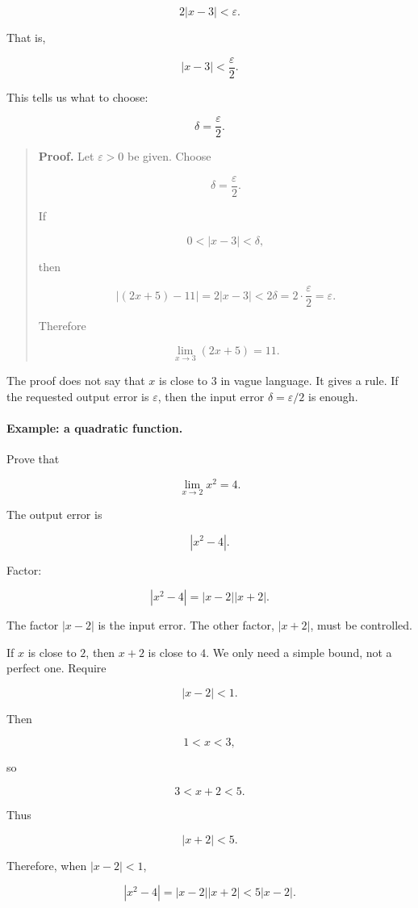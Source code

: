 \[
2|x-3|<\varepsilon.
\]

That is,

\[
|x-3|<\frac{\varepsilon}{2}.
\]

This tells us what to choose:

\[
\delta=\frac{\varepsilon}{2}.
\]

\begin{quote}
\textbf{Proof.}
Let \(\varepsilon>0\) be given.  Choose

\[
\delta=\frac{\varepsilon}{2}.
\]

If

\[
0<|x-3|<\delta,
\]

then

\[
|(2x+5)-11|
=
2|x-3|
<
2\delta
=
2\cdot \frac{\varepsilon}{2}
=
\varepsilon.
\]

Therefore

\[
\lim_{x\to3}(2x+5)=11.
\]
\end{quote}

The proof does not say that \(x\) is close to \(3\) in vague language.  It gives a rule.  If the requested output error is \(\varepsilon\), then the input error \(\delta=\varepsilon/2\) is enough.

\paragraph{Example: a quadratic function.}
Prove that

\[
\lim_{x\to2}x^2=4.
\]

The output error is

\[
|x^2-4|.
\]

Factor:

\[
|x^2-4|
=
|x-2||x+2|.
\]

The factor \(|x-2|\) is the input error.  The other factor, \(|x+2|\), must be controlled.

If \(x\) is close to \(2\), then \(x+2\) is close to \(4\).  We only need a simple bound, not a perfect one.  Require

\[
|x-2|<1.
\]

Then

\[
1<x<3,
\]

so

\[
3<x+2<5.
\]

Thus

\[
|x+2|<5.
\]

Therefore, when \(|x-2|<1\),

\[
|x^2-4|
=
|x-2||x+2|
<
5|x-2|.
\]

